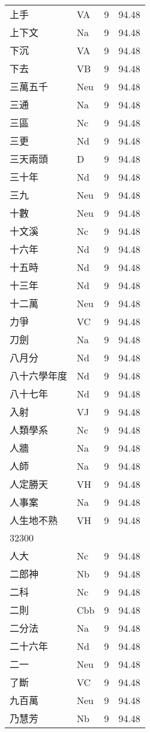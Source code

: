 \documentclass[twocolumn]{book}
\begin{document}
\begin{supertabular}{llrr}
上手 & VA & 9 &  94.48\\
上下文 & Na & 9 &  94.48\\
下沉 & VA & 9 &  94.48\\
下去 & VB & 9 &  94.48\\
三萬五千 & Neu & 9 &  94.48\\
三通 & Na & 9 &  94.48\\
三區 & Nc & 9 &  94.48\\
三更 & Nd & 9 &  94.48\\
三天兩頭 & D & 9 &  94.48\\
三十年 & Nd & 9 &  94.48\\
三九 & Neu & 9 &  94.48\\
十數 & Neu & 9 &  94.48\\
十文溪 & Nc & 9 &  94.48\\
十六年 & Nd & 9 &  94.48\\
十五時 & Nd & 9 &  94.48\\
十三年 & Nd & 9 &  94.48\\
十二萬 & Neu & 9 &  94.48\\
力爭 & VC & 9 &  94.48\\
刀劍 & Na & 9 &  94.48\\
八月分 & Nd & 9 &  94.48\\
八十六學年度 & Nd & 9 &  94.48\\
八十七年 & Nd & 9 &  94.48\\
入射 & VJ & 9 &  94.48\\
人類學系 & Nc & 9 &  94.48\\
人牆 & Na & 9 &  94.48\\
人師 & Na & 9 &  94.48\\
人定勝天 & VH & 9 &  94.48\\
人事案 & Na & 9 &  94.48\\
人生地不熟 & VH & 9 &  94.48\\
32300\\
人大 & Nc & 9 &  94.48\\
二郎神 & Nb & 9 &  94.48\\
二科 & Nc & 9 &  94.48\\
二則 & Cbb & 9 &  94.48\\
二分法 & Na & 9 &  94.48\\
二十六年 & Nd & 9 &  94.48\\
二一 & Neu & 9 &  94.48\\
了斷 & VC & 9 &  94.48\\
九百萬 & Neu & 9 &  94.48\\
乃慧芳 & Nb & 9 &  94.48\\

\end{supertabular}
\end{document}
